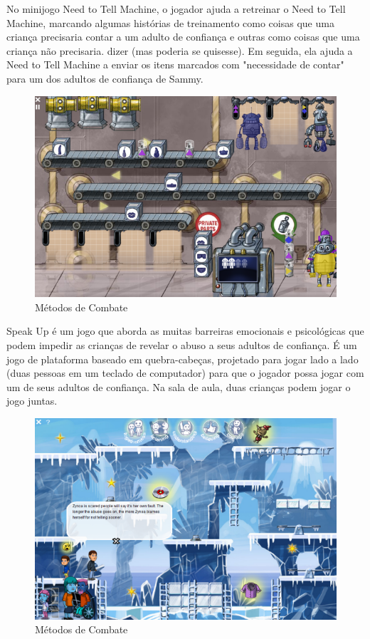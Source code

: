 No minijogo Need to Tell Machine, o jogador ajuda a retreinar o Need to Tell Machine, marcando algumas histórias de treinamento como coisas que uma criança precisaria contar a um adulto de confiança e outras como coisas que uma criança não precisaria. dizer (mas poderia se quisesse). Em seguida, ela ajuda a Need to Tell Machine a enviar os itens marcados com "necessidade de contar" para um dos adultos de confiança de Sammy.



\begin{figure}[htb]

	\caption{\label{fig:Riscos}Métodos de Combate}
  \begin{center}
    \includegraphics[width=0.6\linewidth]{./Figuras/Orbit/robot-factory-screenshot.png}
	\end{center}

\end{figure}

Speak Up é um jogo que aborda as muitas barreiras emocionais e psicológicas que podem impedir as crianças de revelar o abuso a seus adultos de confiança. É um jogo de plataforma baseado em quebra-cabeças, projetado para jogar lado a lado (duas pessoas em um teclado de computador) para que o jogador possa jogar com um de seus adultos de confiança. Na sala de aula, duas crianças podem jogar o jogo juntas.

\begin{figure}[htb]

	\caption{\label{fig:Riscos}Métodos de Combate}
  \begin{center}
    \includegraphics[width=0.5\linewidth]{./Figuras/Orbit/speak-up.png}
	\end{center}

\end{figure}

